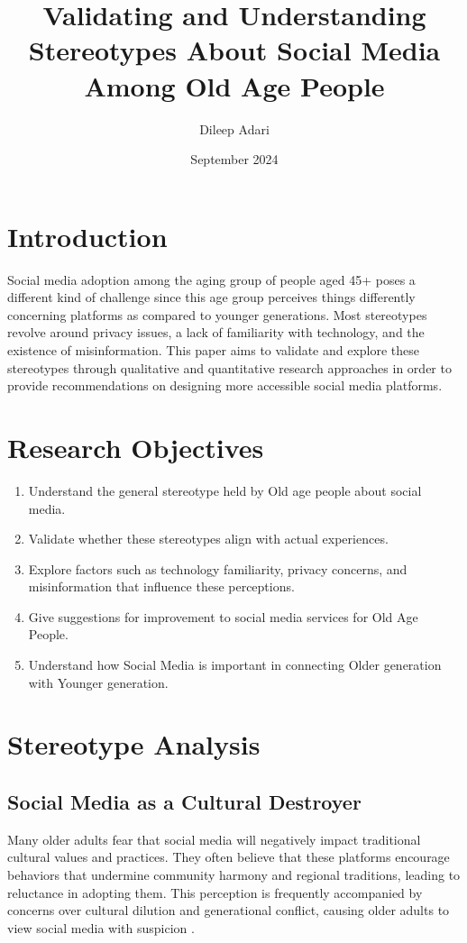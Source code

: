 \documentclass[a4paper,12pt]{article}
\title{Validating and Understanding Stereotypes About Social Media Among Old Age People}
\author{Dileep Adari}
\date{September 2024}
\begin{document}
\maketitle

\section{Introduction}
Social media adoption among the aging group of people aged 45+ poses a different kind of challenge since this age group perceives things differently concerning platforms as compared to younger generations. Most stereotypes revolve around privacy issues, a lack of familiarity with technology, and the existence of misinformation. This paper aims to validate and explore these stereotypes through qualitative and quantitative research approaches in order to provide recommendations on designing more accessible social media platforms.

\section{Research Objectives}
\begin{enumerate}
    \item Understand the general stereotype held by Old age people about social media.
    \item Validate whether these stereotypes align with actual experiences.
    \item Explore factors such as technology familiarity, privacy concerns, and misinformation that influence these perceptions.
    \item Give suggestions for improvement to social media services for Old Age People.
    \item Understand how Social Media is important in connecting Older generation with Younger generation.
\end{enumerate}

\section{Stereotype Analysis}
\subsection{Social Media as a Cultural Destroyer}
Many older adults fear that social media will negatively impact traditional cultural values and practices. They often believe that these platforms encourage behaviors that undermine community harmony and regional traditions, leading to reluctance in adopting them. This perception is frequently accompanied by concerns over cultural dilution and generational conflict, causing older adults to view social media with suspicion \cite{Campbell2018, Lindley2016}.
\end{document}
